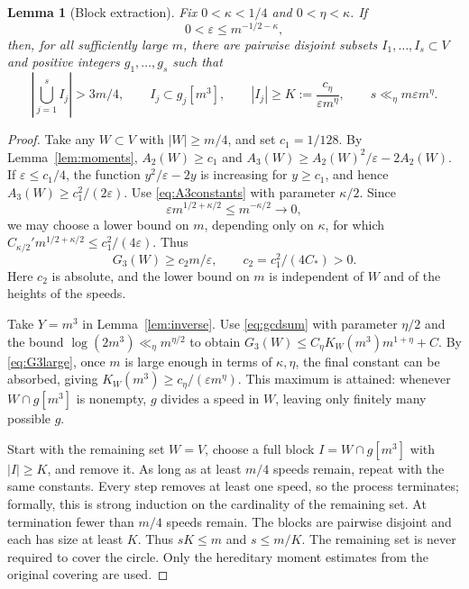 \documentclass[12pt,leqno]{article}
\numberwithin{equation}{section}
\newtheorem{lemma}[theorem]{Lemma}
\theoremstyle{remark}
\begin{document}
\begin{lemma}[Block extraction]\label{lem:extract}
Fix $0<\kappa<1/4$ and $0<\eta<\kappa$. If
\begin{equation}\label{eq:smallcover}
0<\varepsilon\le m^{-1/2-\kappa},
\end{equation}
then, for all sufficiently large $m$, there are pairwise disjoint subsets $I_1,\ldots,I_s\subset V$ and positive integers $g_1,\ldots,g_s$ such that
\begin{equation}\label{eq:blocks}
\left|\bigcup_{j=1}^s I_j\right|>3m/4,\qquad
I_j\subset g_j[m^3],\qquad
|I_j|\ge K:=\frac{c_\eta}{\varepsilon m^\eta},\qquad
s\ll_\eta m\varepsilon m^\eta.
\end{equation}
\end{lemma}
\begin{proof}
Take any $W\subset V$ with $|W|\ge m/4$, and set $c_1=1/128$. By Lemma~\ref{lem:moments}, $A_2(W)\ge c_1$ and
$A_3(W)\ge A_2(W)^2/\varepsilon-2A_2(W)$.
If $\varepsilon\le c_1/4$, the function $y^2/\varepsilon-2y$ is increasing for $y\ge c_1$, and hence
$A_3(W)\ge c_1^2/(2\varepsilon)$. Use \eqref{eq:A3constants} with parameter $\kappa/2$. Since
\[
\varepsilon m^{1/2+\kappa/2}\le m^{-\kappa/2}\longrightarrow0,
\]
we may choose a lower bound on $m$, depending only on $\kappa$, for which $C_{\kappa/2}'m^{1/2+\kappa/2}\le c_1^2/(4\varepsilon)$. Thus
\begin{equation}\label{eq:G3large}
G_3(W)\ge c_2m/\varepsilon,\qquad c_2=c_1^2/(4C_*)>0.
\end{equation}
Here $c_2$ is absolute, and the lower bound on $m$ is independent of $W$ and of the heights of the speeds.

Take $Y=m^3$ in Lemma~\ref{lem:inverse}. Use \eqref{eq:gcdsum} with parameter $\eta/2$ and the bound $\log(2m^3)\ll_\eta m^{\eta/2}$ to obtain
$G_3(W)\le C_\eta K_W(m^3)m^{1+\eta}+C$.
By \eqref{eq:G3large}, once $m$ is large enough in terms of $\kappa,\eta$, the final constant can be absorbed, giving $K_W(m^3)\ge c_\eta/(\varepsilon m^\eta)$. This maximum is attained: whenever $W\cap g[m^3]$ is nonempty, $g$ divides a speed in $W$, leaving only finitely many possible $g$.

Start with the remaining set $W=V$, choose a full block $I=W\cap g[m^3]$ with $|I|\ge K$, and remove it. As long as at least $m/4$ speeds remain, repeat with the same constants. Every step removes at least one speed, so the process terminates; formally, this is strong induction on the cardinality of the remaining set. At termination fewer than $m/4$ speeds remain. The blocks are pairwise disjoint and each has size at least $K$. Thus $sK\le m$ and $s\le m/K$. The remaining set is never required to cover the circle. Only the hereditary moment estimates from the original covering are used.
\end{proof}
\end{document}

